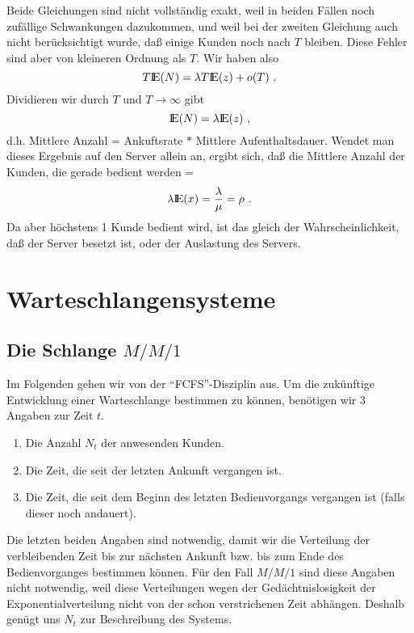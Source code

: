 Beide Gleichungen sind nicht vollständig exakt, weil in beiden Fällen
noch zufällige Schwankungen dazukommen, und weil bei der zweiten
Gleichung auch nicht berücksichtigt wurde, daß einige Kunden noch nach
$T$ bleiben. Diese Fehler sind aber von kleineren Ordnung als $T$. Wir
haben also
\begin{displaymath}
T {\rm I\kern-0.2em E} (N) = \lambda T {\rm I\kern-0.2em E} (z) + o(T) ~.
\end{displaymath}
Dividieren wir durch $T$ und $T \rightarrow \infty$ gibt
\begin{displaymath}
{\rm I\kern-0.2em E} (N) = \lambda  {\rm I\kern-0.2em E} (z) ~,
\end{displaymath}
d.h. Mittlere Anzahl = Ankuftsrate $*$ Mittlere Aufenthaltsdauer. Wendet
man dieses Ergebnis auf den Server allein an, ergibt sich, daß die
Mittlere Anzahl der Kunden, die gerade bedient werden =
\begin{displaymath}
\lambda  {\rm I\kern-0.2em E} (x) = \frac{\lambda}{\mu} = \rho ~.
\end{displaymath}
Da aber höchstens 1 Kunde bedient wird, ist das gleich der
Wahrscheinlichkeit, daß der Server besetzt ist, oder der Auslastung des
Servers.
\chapter{Warteschlangensysteme}
\section{Die Schlange $M/M/1$}
Im Folgenden gehen wir von der \enquote{FCFS}-Disziplin aus.
Um die zukünftige Entwicklung einer Warteschlange bestimmen zu können,
benötigen wir 3 Angaben zur Zeit $t$.
\begin{enumerate}
\item Die Anzahl $N_{t}$ der anwesenden Kunden.
\item Die Zeit, die seit der letzten Ankunft vergangen ist.
\item Die Zeit, die seit dem Beginn des letzten Bedienvorgangs vergangen
ist (falls dieser noch andauert).
\end{enumerate}
Die letzten beiden Angaben sind notwendig, damit wir die Verteilung der
verbleibenden Zeit bis zur nächsten Ankunft bzw. bis zum Ende des
Bedienvorganges bestimmen können. Für den Fall $M/M/1$ sind diese
Angaben nicht notwendig, weil diese Verteilungen wegen der
Gedächtnislosigkeit der Exponentialverteilung nicht von der schon
verstrichenen Zeit abhängen. Deshalb genügt uns $N_{t}$ zur Beschreibung
des Systems.

